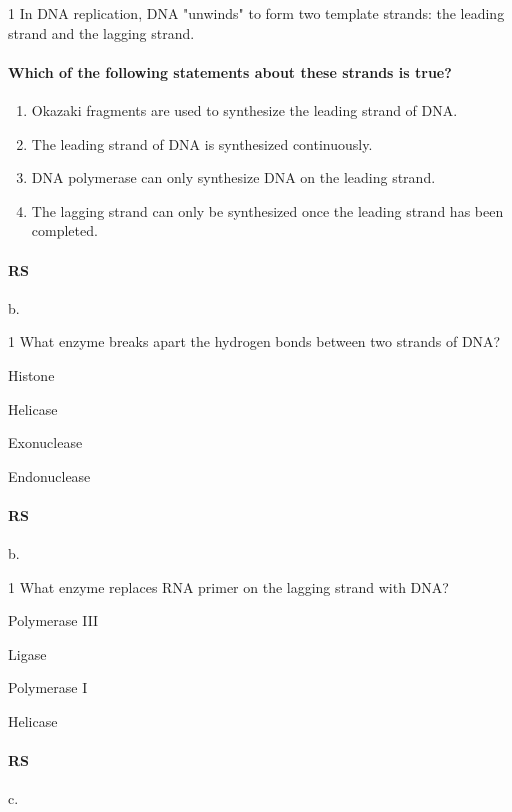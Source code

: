 \documentclass[\mainfilename]{subfiles}
\begin{document}
\begin{questionBox}1{ %
    In DNA replication, DNA "unwinds" to form two template strands: the leading strand and the lagging strand.
} %
    \paragraph*{Which of the following statements about these strands is true?}
    \begin{enumerate}
        \item Okazaki fragments are used to synthesize the leading strand of DNA.
        \item The leading strand of DNA is synthesized continuously.
        \item DNA polymerase can only synthesize DNA on the leading strand.
        \item The lagging strand can only be synthesized once the leading strand has been completed.
    \end{enumerate}
    \paragraph*{RS} b.
\end{questionBox}

\begin{questionBox}1{ %
    What enzyme breaks apart the hydrogen bonds between two strands of DNA?
} %
    \begin{enumerate}
        \begin{multicols}{4}
            \item Histone
            \item Helicase
            \item Exonuclease 
            \item Endonuclease            
        \end{multicols}
    \end{enumerate}
    \paragraph*{RS} b.
\end{questionBox}

\begin{questionBox}1{ %
    What enzyme replaces RNA primer on the lagging strand with DNA?
} %
    \begin{enumerate}
        \begin{multicols}{4}
            \item Polymerase III 
            \item Ligase
            \item Polymerase I 
            \item Helicase
        \end{multicols}
    \end{enumerate}
    \paragraph*{RS} c.
\end{questionBox}
\end{document}
